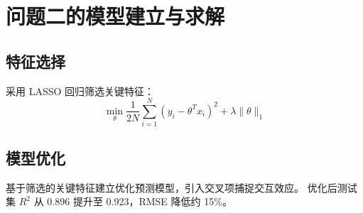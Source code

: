 \section{问题二的模型建立与求解}

\subsection{特征选择}

采用 LASSO 回归筛选关键特征：
\[
  \min_{\theta} \frac{1}{2N} \sum_{i=1}^{N} (y_i - \theta^T x_i)^2 + \lambda \|\theta\|_1
\]

\subsection{模型优化}

基于筛选的关键特征建立优化预测模型，引入交叉项捕捉交互效应。
优化后测试集 $R^2$ 从 0.896 提升至 0.923，RMSE 降低约 15\%。
